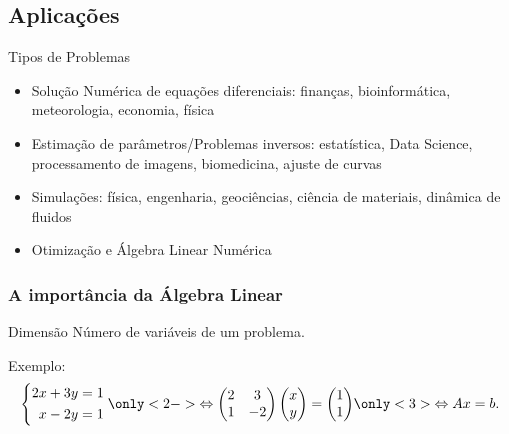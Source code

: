 \documentclass{beamer}
\begin{document}
\begin{darkframes}
  \section{Aplicações}
  
  \begin{frame}{Tipos de Problemas}
    \begin{itemize}
    \item Solução Numérica de equações diferenciais: finanças, bioinformática, meteorologia, economia, física
    \item Estimação de parâmetros/Problemas inversos: estatística, Data Science, processamento de imagens, biomedicina, ajuste de curvas
    \item Simulações: física, engenharia, geociências, ciência de materiais, dinâmica de fluidos
    \item Otimização e Álgebra Linear Numérica
    \end{itemize}
  \end{frame}
  
  \begin{frame}
    \frametitle{A importância da Álgebra Linear}
    \begin{block}{Dimensão}
      Número de variáveis de um problema.
    \end{block}
    \vfill
    Exemplo:
    \begin{equation*}
      \left\{ \begin{aligned}
          2x+3y &= 1\\
          x-2y &= 1
        \end{aligned}\right.
      \only<2->{\Leftrightarrow
        \begin{pmatrix}
          2 & 3\\
          1 & -2
        \end{pmatrix}
        \begin{pmatrix} x\\y\end{pmatrix}
        = \begin{pmatrix}1\\1\end{pmatrix}}
      \only<3>{\Leftrightarrow Ax=b.}
    \end{equation*}
  \end{frame}
  

\end{darkframes}
\end{document}
